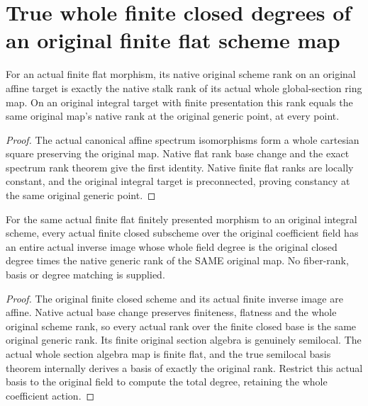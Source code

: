 \section{True whole finite closed degrees of an original finite flat scheme map}

\begin{theorem}
\label{thm:fc-scheme-finite-flat-original-rank}
\leanok
{}
For an actual finite flat morphism, its native original scheme rank
on an original affine target is exactly the native stalk rank of
its actual whole global-section ring map. On an original integral
target with finite presentation this rank equals the same original
map's native rank at the original generic point, at every point.
\end{theorem}
\begin{proof}
The actual canonical affine spectrum isomorphisms form a whole
cartesian square preserving the original map. Native flat rank
base change and the exact spectrum rank theorem give the first
identity. Native finite flat ranks are locally constant, and the
original integral target is preconnected, proving constancy at the
same original generic point.
\end{proof}

\begin{theorem}
\label{thm:fc-scheme-finite-flat-closed-degree}
\leanok
{}
For the same actual finite flat finitely presented morphism to an
original integral scheme, every actual finite closed subscheme over
the original coefficient field has an entire actual inverse image
whose whole field degree is the original closed degree times the
native generic rank of the SAME original map. No fiber-rank, basis
or degree matching is supplied.
\end{theorem}
\begin{proof}
The original finite closed scheme and its actual finite inverse
image are affine. Native actual base change preserves finiteness,
flatness and the whole original scheme rank, so every actual rank
over the finite closed base is the same original generic rank.
Its finite original section algebra is genuinely semilocal. The
actual whole section algebra map is finite flat, and the true
semilocal basis theorem internally derives a basis of exactly the
original rank. Restrict this actual basis to the original field to
compute the total degree, retaining the whole coefficient action.
\end{proof}
